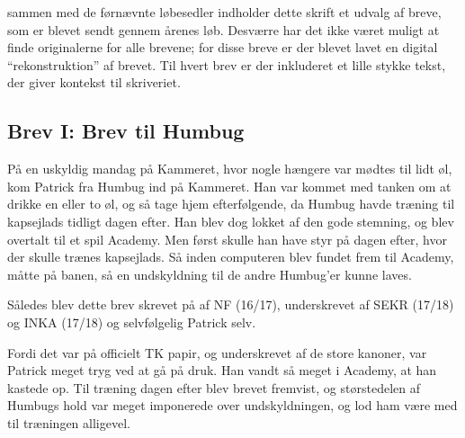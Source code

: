 sammen med de førnævnte løbesedler indholder dette skrift et udvalg af breve, som er blevet sendt gennem årenes løb. Desværre har det ikke været muligt at finde originalerne for alle brevene; for disse breve er der blevet lavet en digital ``rekonstruktion'' af brevet. Til hvert brev er der inkluderet et lille stykke tekst, der giver kontekst til skriveriet.

\newpage

\subsection{Brev I: Brev til Humbug}
På en uskyldig mandag på Kammeret, hvor nogle hængere var mødtes til lidt øl, kom Patrick fra Humbug ind på Kammeret. Han var kommet med tanken om at drikke en eller to øl, og så tage hjem efterfølgende, da Humbug havde træning til kapsejlads tidligt dagen efter. Han blev dog lokket af den gode stemning, og blev overtalt til et spil Academy. Men først skulle han have styr på dagen efter, hvor der skulle trænes kapsejlads. Så inden computeren blev fundet frem til Academy, måtte \RemToR på banen, så en undskyldning til de andre Humbug'er kunne laves.


\newpage

Således blev dette brev skrevet på \RemToR af NF (16/17), underskrevet af SEKR (17/18) og INKA (17/18) og selvfølgelig Patrick selv.

Fordi det var på officielt TK papir, og underskrevet af de store kanoner, var Patrick meget tryg ved at gå på druk. Han vandt så meget i Academy, at han kastede op. Til træning dagen efter blev brevet fremvist, og størstedelen af Humbugs hold var meget imponerede over undskyldningen, og lod ham være med til træningen alligevel.

\vfill
{}
\vfill
